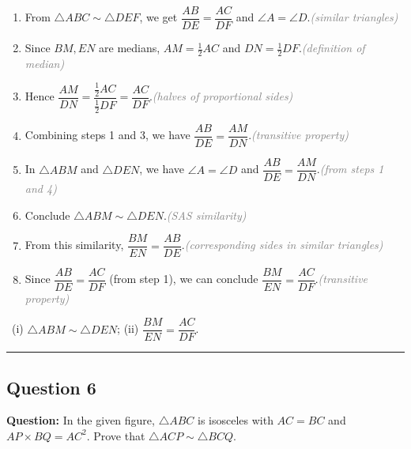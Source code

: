 \documentclass{article}
\newenvironment{steps}{%
  \begin{enumerate}[label=\textcolor{primary}{Step~\arabic*:}, leftmargin=*]
}{\end{enumerate}}
\newcommand{\dul}[1]{\uuline{#1}}
\newcommand{\reason}[1]{\hfill\textit{\textcolor{gray}{(#1)}}}
\newcommand{\solutionrule}{\par\noindent\color{accent}\rule{\linewidth}{0.6pt}\par\smallskip}
\newcommand{\finalanswer}[1]{\noindent\textbf{\textcolor{accent}{\dul{Answer:}}}~#1\solutionrule}
\begin{document}
\begin{center}
\end{center}

\begin{steps}
  \item From $\triangle ABC \sim \triangle DEF$, we get $\dfrac{AB}{DE}=\dfrac{AC}{DF}$ and $\angle A = \angle D$.\reason{similar triangles}
  \item Since $BM, EN$ are medians, $AM=\tfrac12 AC$ and $DN=\tfrac12 DF$.\reason{definition of median}
  \item Hence $\dfrac{AM}{DN}=\dfrac{\tfrac12 AC}{\tfrac12 DF}=\dfrac{AC}{DF}$.\reason{halves of proportional sides}
  \item Combining steps 1 and 3, we have $\dfrac{AB}{DE}=\dfrac{AM}{DN}$.\reason{transitive property}
  \item In $\triangle ABM$ and $\triangle DEN$, we have $\angle A=\angle D$ and $\dfrac{AB}{DE}=\dfrac{AM}{DN}$.\reason{from steps 1 and 4}
  \item Conclude $\triangle ABM\sim\triangle DEN$.\reason{SAS similarity}
  \item From this similarity, $\dfrac{BM}{EN}=\dfrac{AB}{DE}$.\reason{corresponding sides in similar triangles}
  \item Since $\dfrac{AB}{DE}=\dfrac{AC}{DF}$ (from step 1), we can conclude $\dfrac{BM}{EN}=\dfrac{AC}{DF}$.\reason{transitive property}
\end{steps}

\finalanswer{(i) $\triangle ABM \sim \triangle DEN$; (ii) $\dfrac{BM}{EN}=\dfrac{AC}{DF}$.}

\subsection*{Question 6}
\textbf{Question:} In the given figure, $\triangle ABC$ is isosceles with $AC=BC$ and $AP \times BQ = AC^2$. Prove that $\triangle ACP \sim \triangle BCQ$.
\end{document}
